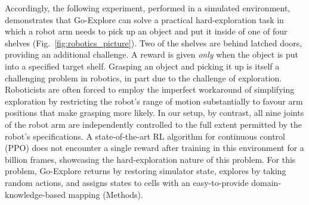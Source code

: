 \documentclass{nature}
\renewcommand*{\cite}[1]{\supercite{#1}}
\begin{document}
Accordingly, the following experiment, performed in a simulated environment, demonstrates that Go-Explore can solve a practical hard-exploration task in which a robot arm needs to pick up an object and put it inside of one of four shelves (Fig.~\ref{fig:robotics_picture}).
Two of the shelves are behind latched doors, providing an additional challenge.
A reward is given \emph{only} when the object is put into a specified target shelf.
Grasping an object and picking it up is itself a challenging problem in robotics, in part due to the challenge of exploration\cite{nair2018overcoming,kraft2010development}. Roboticists are often forced to employ the imperfect workaround of simplifying exploration by restricting the robot's range of motion substantially to favour arm positions that make grasping more likely\cite{andrychowicz2017hindsight}.
In our setup, by contrast, all nine joints of the robot arm are independently controlled to the full extent permitted by the robot's specifications.
A state-of-the-art RL algorithm for continuous control (PPO\cite{Schulman2017ProximalPO}) does not encounter a single reward after training in this environment for a billion frames, showcasing the hard-exploration nature of this problem.
For this problem, Go-Explore returns by restoring simulator state, explores by taking random actions, and assigns states to cells with an easy-to-provide domain-knowledge-based mapping (Methods).
\end{document}
